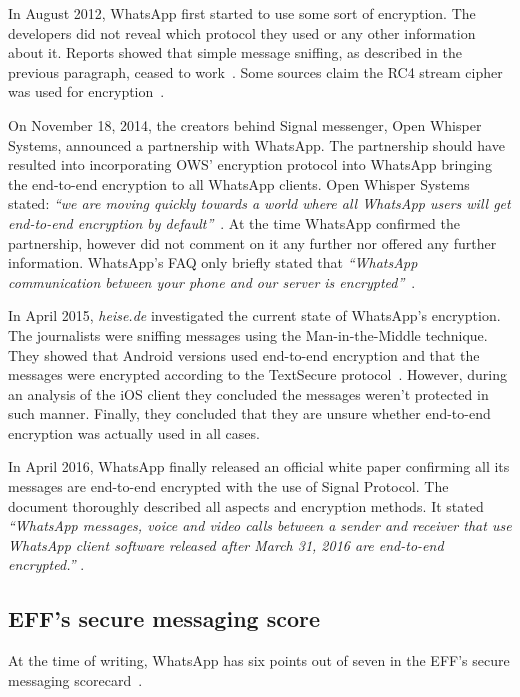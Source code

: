 \documentclass[thesis=M,english]{FITthesis}[2012/10/20]
\begin{document}
In August 2012, WhatsApp first started to use some sort of encryption. The developers did not reveal which protocol they used or any other information about it. Reports showed that simple message sniffing, as described in the previous paragraph, ceased to work~\cite{whatsapp-sniffernomore}. Some sources claim the  RC4 stream cipher was used for encryption~\cite{whatsapp-rc4,whatsapp-rc42}.

On November 18, 2014, the creators behind Signal messenger, Open Whisper Systems, announced a partnership with WhatsApp. The partnership should have resulted into incorporating OWS' encryption protocol into WhatsApp bringing the end-to-end encryption to all WhatsApp clients. Open Whisper Systems stated: \emph{``we are moving quickly towards a world where all WhatsApp users will get end-to-end encryption by default''}~\cite{openwhisperwhatsapp}. At the time WhatsApp confirmed the partnership, however did not comment on it any further nor offered any further information. WhatsApp's FAQ only briefly stated that \emph{``WhatsApp communication between your phone and our server is encrypted''}~\cite{whatsapp-faq}.

In April 2015, \emph{heise.de} investigated the current state of WhatsApp's encryption. The journalists were sniffing messages using the Man-in-the-Middle technique. They showed that Android versions used end-to-end encryption and that the messages were encrypted according to the TextSecure protocol~\cite{whatsapp-encstate}. However, during an analysis of the iOS client they concluded the messages weren't protected in such manner. Finally, they concluded that they are unsure whether end-to-end encryption was actually used in all cases.

In April 2016, WhatsApp finally released an official white paper confirming all its messages are end-to-end encrypted with the use of Signal Protocol. The document thoroughly described all aspects and encryption methods. It stated \emph{``WhatsApp messages, voice and video calls between a sender and receiver that use WhatsApp client software released after March 31, 2016 are end-to-end encrypted.''} \cite{whatsapp-whitepaper}.


\subsection{EFF's secure messaging score}

At the time of writing, WhatsApp has six points out of seven in the EFF's secure messaging scorecard~\cite{eff-score}.
\end{document}
